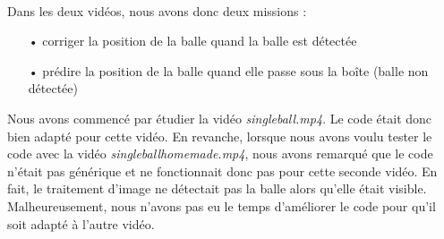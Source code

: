 \paragraph{}
Dans les deux vidéos, nous avons donc deux missions :
	\begin{itemize}
		\item[•] corriger la position de la balle quand la balle est détectée
		\item[•] prédire la position de la balle quand elle passe sous la boîte (balle non détectée) \\
	\end{itemize}
	
Nous avons commencé par étudier la vidéo \emph{singleball.mp4}. Le code était donc bien adapté pour cette vidéo. En revanche, lorsque nous avons voulu tester le code avec la vidéo \emph{singleballhomemade.mp4}, nous avons remarqué que le code n'était pas générique et ne fonctionnait donc pas pour cette seconde vidéo. En fait, le traitement d'image ne détectait pas la balle alors qu'elle était visible. \\

Malheureusement, nous n'avons pas eu le temps d'améliorer le code pour qu'il soit adapté à l'autre vidéo.